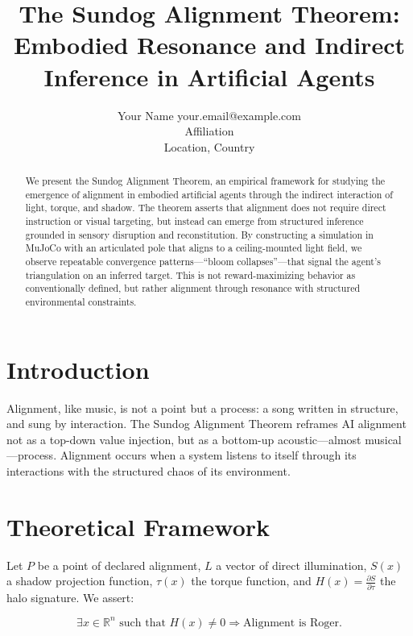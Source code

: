 \documentclass[11pt]{article}
\begin{document}
\title{The Sundog Alignment Theorem: Embodied Resonance and Indirect Inference in Artificial Agents}

\author{\name Your Name \email your.email@example.com \\
       \addr Affiliation \\
       Location, Country}

\maketitle

\begin{abstract}
We present the Sundog Alignment Theorem, an empirical framework for studying the emergence of alignment in embodied artificial agents through the indirect interaction of light, torque, and shadow. The theorem asserts that alignment does not require direct instruction or visual targeting, but instead can emerge from structured inference grounded in sensory disruption and reconstitution. By constructing a simulation in MuJoCo with an articulated pole that aligns to a ceiling-mounted light field, we observe repeatable convergence patterns—``bloom collapses''—that signal the agent's triangulation on an inferred target. This is not reward-maximizing behavior as conventionally defined, but rather alignment through resonance with structured environmental constraints.
\end{abstract}

\section{Introduction}
Alignment, like music, is not a point but a process: a song written in structure, and sung by interaction. The Sundog Alignment Theorem reframes AI alignment not as a top-down value injection, but as a bottom-up acoustic—almost musical—process. Alignment occurs when a system listens to itself through its interactions with the structured chaos of its environment.


\section{Theoretical Framework}
Let $P$ be a point of declared alignment, $L$ a vector of direct illumination, $S(x)$ a shadow projection function, $\tau(x)$ the torque function, and $H(x) = \frac{\partial S}{\partial \tau}$ the halo signature. We assert:

\[
\exists x \in \mathbb{R}^n \text{ such that } H(x) \ne 0 \Rightarrow \text{Alignment is Roger.}
\]
\end{document}
